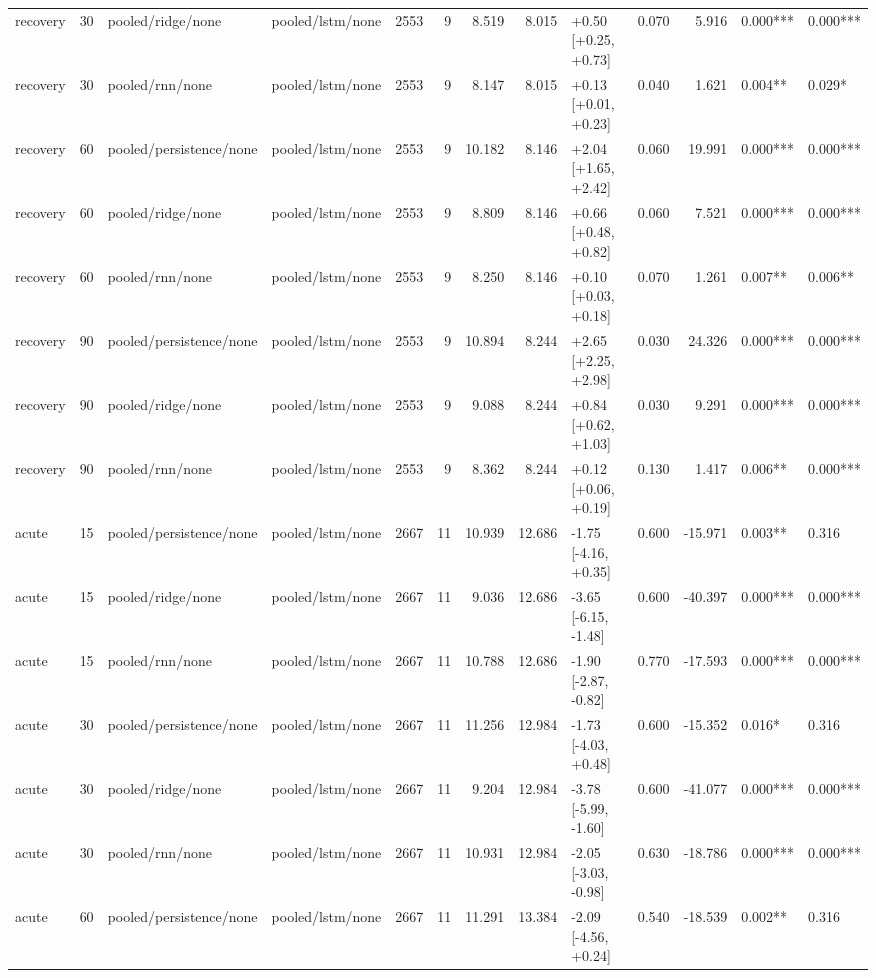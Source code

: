 \begin{tabular}{lrllrrrrlrrll}
recovery & 30 & pooled/ridge/none & pooled/lstm/none & 2553 & 9 & 8.519 & 8.015 & +0.50 [+0.25, +0.73] & 0.070 & 5.916 & 0.000*** & 0.000*** \\
recovery & 30 & pooled/rnn/none & pooled/lstm/none & 2553 & 9 & 8.147 & 8.015 & +0.13 [+0.01, +0.23] & 0.040 & 1.621 & 0.004** & 0.029* \\
recovery & 60 & pooled/persistence/none & pooled/lstm/none & 2553 & 9 & 10.182 & 8.146 & +2.04 [+1.65, +2.42] & 0.060 & 19.991 & 0.000*** & 0.000*** \\
recovery & 60 & pooled/ridge/none & pooled/lstm/none & 2553 & 9 & 8.809 & 8.146 & +0.66 [+0.48, +0.82] & 0.060 & 7.521 & 0.000*** & 0.000*** \\
recovery & 60 & pooled/rnn/none & pooled/lstm/none & 2553 & 9 & 8.250 & 8.146 & +0.10 [+0.03, +0.18] & 0.070 & 1.261 & 0.007** & 0.006** \\
recovery & 90 & pooled/persistence/none & pooled/lstm/none & 2553 & 9 & 10.894 & 8.244 & +2.65 [+2.25, +2.98] & 0.030 & 24.326 & 0.000*** & 0.000*** \\
recovery & 90 & pooled/ridge/none & pooled/lstm/none & 2553 & 9 & 9.088 & 8.244 & +0.84 [+0.62, +1.03] & 0.030 & 9.291 & 0.000*** & 0.000*** \\
recovery & 90 & pooled/rnn/none & pooled/lstm/none & 2553 & 9 & 8.362 & 8.244 & +0.12 [+0.06, +0.19] & 0.130 & 1.417 & 0.006** & 0.000*** \\
acute & 15 & pooled/persistence/none & pooled/lstm/none & 2667 & 11 & 10.939 & 12.686 & -1.75 [-4.16, +0.35] & 0.600 & -15.971 & 0.003** & 0.316 \\
acute & 15 & pooled/ridge/none & pooled/lstm/none & 2667 & 11 & 9.036 & 12.686 & -3.65 [-6.15, -1.48] & 0.600 & -40.397 & 0.000*** & 0.000*** \\
acute & 15 & pooled/rnn/none & pooled/lstm/none & 2667 & 11 & 10.788 & 12.686 & -1.90 [-2.87, -0.82] & 0.770 & -17.593 & 0.000*** & 0.000*** \\
acute & 30 & pooled/persistence/none & pooled/lstm/none & 2667 & 11 & 11.256 & 12.984 & -1.73 [-4.03, +0.48] & 0.600 & -15.352 & 0.016* & 0.316 \\
acute & 30 & pooled/ridge/none & pooled/lstm/none & 2667 & 11 & 9.204 & 12.984 & -3.78 [-5.99, -1.60] & 0.600 & -41.077 & 0.000*** & 0.000*** \\
acute & 30 & pooled/rnn/none & pooled/lstm/none & 2667 & 11 & 10.931 & 12.984 & -2.05 [-3.03, -0.98] & 0.630 & -18.786 & 0.000*** & 0.000*** \\
acute & 60 & pooled/persistence/none & pooled/lstm/none & 2667 & 11 & 11.291 & 13.384 & -2.09 [-4.56, +0.24] & 0.540 & -18.539 & 0.002** & 0.316 \\

\end{tabular}
